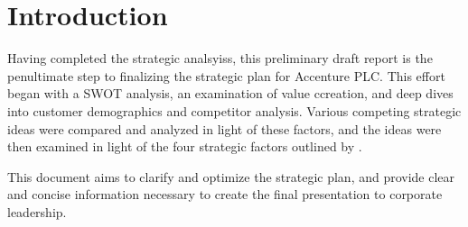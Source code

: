 \section{Introduction}

Having completed the strategic analsyiss, this preliminary draft report is the penultimate step to finalizing the strategic plan for Accenture PLC. This effort began with a SWOT analysis, an examination of value ccreation, and deep dives into customer demographics and competitor analysis. Various competing strategic ideas were compared and analyzed in light of these factors, and the ideas were then examined in light of the four strategic factors outlined by \textcite{Tracy2015}.

This document aims to clarify and optimize the strategic plan, and provide clear and concise information necessary to create the final presentation to corporate leadership.
